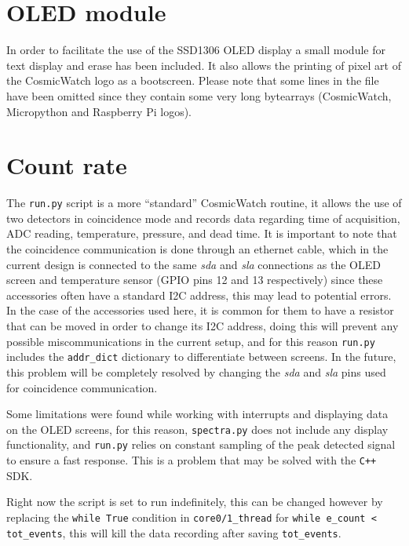 \section{OLED module}

In order to facilitate the use of the SSD1306 OLED display a small module for text display and erase has been included. It also allows the printing of pixel art of the CosmicWatch logo as a bootscreen. Please note that some lines in the file have been omitted since they contain some very long bytearrays (CosmicWatch, Micropython and Raspberry Pi logos).



\section{Count rate}

The \texttt{run.py} script is a more ``standard'' CosmicWatch routine, it allows the use of two detectors in coincidence mode and records data regarding time of acquisition, ADC reading, temperature, pressure, and dead time. It is important to note that the coincidence communication is done through an ethernet cable, which in the current design is connected to the same \textit{sda} and \textit{sla} connections as the OLED screen and temperature sensor (GPIO pins 12 and 13 respectively) since these accessories often have a standard I2C address, this may lead to potential errors. In the case of the accessories used here, it is common for them to have a resistor that can be moved in order to change its I2C address, doing this will prevent any possible miscommunications in the current setup, and for this reason \texttt{run.py} includes the \texttt{addr\_dict} dictionary to differentiate between screens. In the future, this problem will be completely resolved by changing the \textit{sda} and \textit{sla} pins used for coincidence communication.

Some limitations were found while working with interrupts and displaying data on the OLED screens, for this reason, \texttt{spectra.py} does not include any display functionality, and \texttt{run.py} relies on constant sampling of the peak detected signal to ensure a fast response. This is a problem that may be solved with the \texttt{C++} SDK.

Right now the script is set to run indefinitely, this can be changed however by replacing the \texttt{while True} condition in \texttt{core0/1\_thread} for \texttt{while e\_count < tot\_events}, this will kill the data recording after saving \texttt{tot\_events}.

